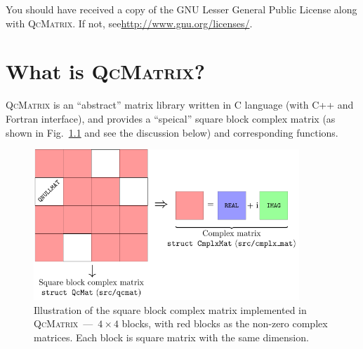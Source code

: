 \documentclass[a4paper,11pt,twoside,openright]{book}
\begin{document}
You should have received a copy of the GNU Lesser General Public License
along with \textsc{QcMatrix}. If not, see\linebreak \url{http://www.gnu.org/licenses/}.
\endgroup
\clearpage

\pagestyle{headings}


\tableofcontents

%

%

\mainmatter
{}

\chapter{What is \textsc{QcMatrix}?}
\label{chapter-introduction}

\textsc{QcMatrix} is an ``abstract'' matrix library written in C language (with C++
and Fortran interface), and provides a ``speical'' square block complex matrix (as
shown in Fig.~\ref{fig-block-cmplx} and see the discussion below) and corresponding
functions.
\begin{figure}[htbp]
  \centering
  \includegraphics[width=10cm]{block_cmplx.pdf}
  \caption{Illustration of the square block complex matrix implemented in
    \textsc{QcMatrix}~---~$4\times 4$ blocks, with red blocks as the non-zero
    complex matrices. Each block is square matrix with the same dimension.}
  \label{fig-block-cmplx}
\end{figure}
\end{document}
